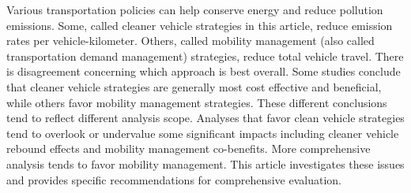 Various transportation policies can help conserve energy and reduce pollution emissions. Some, called cleaner vehicle strategies in this article, reduce emission rates per vehicle-kilometer. Others, called mobility management (also called transportation demand management) strategies, reduce total vehicle travel. There is disagreement concerning which approach is best overall. Some studies conclude that cleaner vehicle strategies are generally most cost effective and beneficial, while others favor mobility management strategies. These different conclusions tend to reflect different analysis scope. Analyses that favor clean vehicle strategies tend to overlook or undervalue some significant impacts including cleaner vehicle rebound effects and mobility management co-benefits. More comprehensive analysis tends to favor mobility management. This article investigates these issues and provides specific recommendations for comprehensive evaluation.